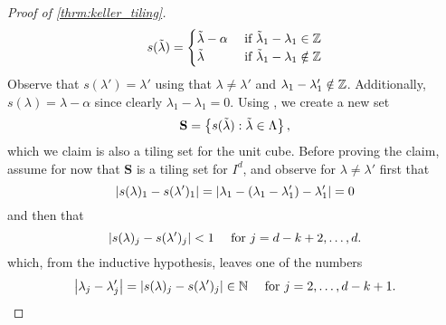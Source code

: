 \documentclass[../thesis.tex]{subfiles}
\begin{document}
\begin{proof}[Proof of \cref{thrm:keller_tiling}]
\begin{equation}
        s(\tilde{\lambda}) = 
        \begin{cases}
            \tilde{\lambda} - \alpha & \text{ if } \tilde{\lambda}_1-\lambda_1 \in \mathbb{Z}\\
            \tilde{\lambda} & \text{ if } \tilde{\lambda}_1-\lambda_1 \notin \mathbb{Z}\\
        \end{cases}
    \end{equation}
    Observe that $s(\lambda')=\lambda'$ using that  $\lambda \neq \lambda'$ and $\lambda_{1}-\lambda_{1}' \notin \mathbb{Z}$. Additionally, $s(\lambda)=\lambda-\alpha$ since clearly $\lambda_{1}-\lambda_{1} = 0$. Using , we create a new set 
    \begin{equation*}
        \mathbf{S} = \left\{s(\tilde{\lambda}) :\tilde{\lambda} \in  \Lambda \right\},
    \end{equation*}
    which we claim is also a tiling set for the unit cube. Before proving the claim, assume for now that $\mathbf{S}$ is a tiling set for $I^d$, and observe for $\lambda\neq \lambda'$ first that 
    \begin{equation*}
        \left| s(\lambda)_1 - s(\lambda')_1\right| = \left|\lambda_1 - \left(\lambda_1-\lambda_1'\right) - \lambda_1'\right| = 0
    \end{equation*}
    and then that
    \begin{equation*}
        \left| s(\lambda)_j - s(\lambda')_j\right| < 1 \quad \text{ for } j= d-k+2,\dots,d.
    \end{equation*}
    which, from the inductive hypothesis, leaves one of the numbers 
    \begin{equation*}
        \left|\lambda_j - \lambda_j'\right| = \left|s(\lambda)_j - s(\lambda')_j\right| \in \mathbb{N} \quad \text{ for } j = 2,\dots, d-k+1.
    \end{equation*}



\end{proof}
\end{document}
